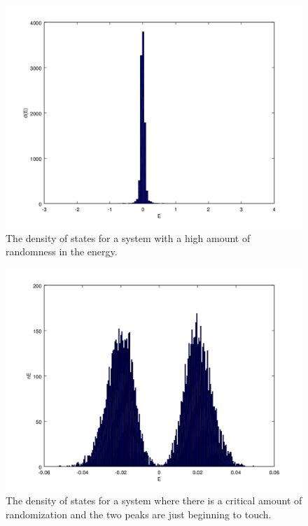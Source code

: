 \begin{figure}[htbp]
\begin{center}
\includegraphics[scale=.50]{veryCloseDos.png}
\caption{The density of states for a system with a high amount of randomness in the energy.}
\label{moundDoS}
\end{center}
\end{figure}

\begin{figure}[htbp]
\begin{center}
\includegraphics[scale=.50]{critDoS.png}
\caption{The density of states for a system where there is a critical amount of randomization and the two peaks are just beginning to touch.}
\label{critDoS}
\end{center}
\end{figure}


